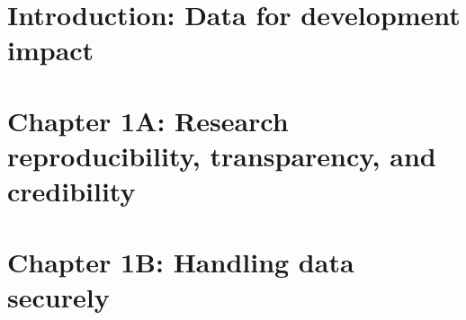 %
%
%
%




\cleardoublepage
\chapter{Introduction: Data for development impact} %





\chapter{Chapter 1A: Research reproducibility, transparency, and credibility}
\label{ch:1}





\chapter{Chapter 1B: Handling data securely}
\label{ch:1}




